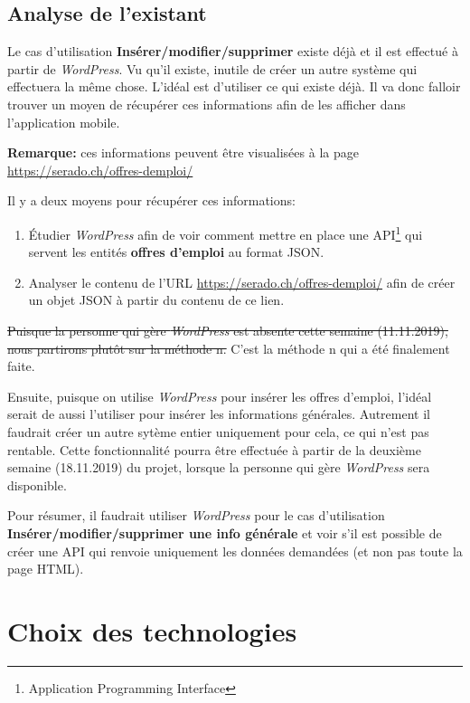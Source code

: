 \documentclass[french]{report}
\begin{document}
\subsection{Analyse de l'existant}

Le cas d'utilisation \textbf{Insérer/modifier/supprimer} existe déjà et il est
effectué à partir de \textit{WordPress}. Vu qu'il existe, inutile de créer un autre
système qui effectuera la même chose. L'idéal est d'utiliser ce qui existe déjà. Il
va donc falloir trouver un moyen de récupérer ces informations afin de les afficher
dans l'application mobile.

\textbf{Remarque:} ces informations peuvent être visualisées à la page 
\url{https://serado.ch/offres-demploi/}

Il y a deux moyens pour récupérer ces informations:
\begin{enumerate}
    \item Étudier \textit{WordPress} afin de voir comment mettre en place une
    API\footnote{Application Programming Interface} qui servent les entités
    \textbf{offres d'emploi} au format JSON.
    \item Analyser le contenu de l'URL \url{https://serado.ch/offres-demploi/} afin
    de créer un objet JSON à partir du contenu de ce lien.
\end{enumerate}
\vspace{1em}

\sout{Puisque la personne qui gère \textit{WordPress} est absente cette semaine
(11.11.2019), nous partirons plutôt sur la méthode n.} C'est la méthode
n qui a été finalement faite.

Ensuite, puisque on utilise \textit{WordPress} pour insérer les offres d'emploi,
l'idéal serait de aussi l'utiliser pour insérer les informations générales.
Autrement il faudrait créer un autre sytème entier uniquement pour cela, ce qui n'est
pas rentable. Cette fonctionnalité pourra être effectuée à partir de la deuxième semaine
(18.11.2019) du projet, lorsque la personne qui gère \textit{WordPress} sera disponible.

Pour résumer, il faudrait utiliser \textit{WordPress} pour le cas d'utilisation
\textbf{Insérer/modifier/supprimer une info générale} et voir s'il est possible de
créer une API qui renvoie uniquement les données demandées (et non pas toute la
page HTML).


\section{Choix des technologies}
\end{document}
